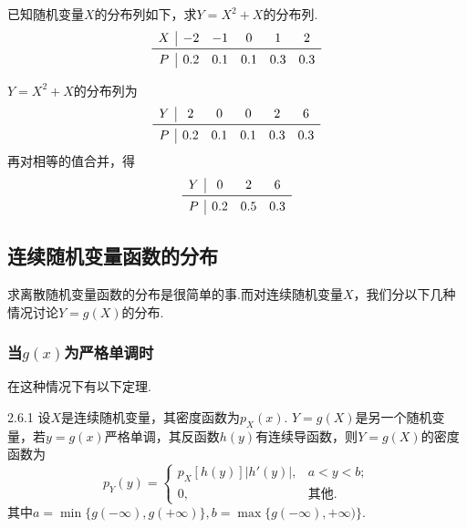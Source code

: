 \begin{example}
  已知随机变量$X$的分布列如下，求$Y=X^2+X$的分布列.
  \[
  \begin{array}{c|*{5}{c}}
    X & -2 & -1 & 0 & 1 & 2 \\
    \midrule
    P & 0.2 & 0.1 & 0.1 & 0.3 & 0.3
  \end{array}
\]
\end{example}
\begin{solution}
  $Y=X^2+X$的分布列为
  \[
    \begin{array}{c|*{5}{c}}
      Y & 2 & 0 & 0 & 2 & 6 \\
      \midrule
      P & 0.2 & 0.1 & 0.1 & 0.3 & 0.3
    \end{array}
  \]
  再对相等的值合并，得
  \[
    \begin{array}{c|ccc}
      Y & 0 & 2 & 6 \\
      \midrule
      P & 0.2 & 0.5 & 0.3
    \end{array}
  \]
\end{solution}

\subsection{连续随机变量函数的分布}
求离散随机变量函数的分布是很简单的事.而对连续随机变量$X$，我们分以下几种情况讨论$Y=g(X)$的分布.

\subsubsection{当$g(x)$为严格单调时}
在这种情况下有以下定理.
\begin{theorem}{}{2.6.1}
  设$X$是连续随机变量，其密度函数为$p_X(x)$. $Y=g(X)$是另一个随机变量，若$y=g(x)$严格单调，其反函数$h(y)$有连续导函数，则$Y=g(X)$的密度函数为
  \begin{equation}\label{eq2.6.1}
    p_Y(y) = \begin{cases}
      p_X[h(y)]|h'(y)|, & a < y < b; \\
      0, & \text{其他}.
    \end{cases}
  \end{equation}
  其中$a=\min\{g(-\infty),g(+\infty)\},
  b=\max\{g(-\infty),+\infty)\}$.
\end{theorem}


